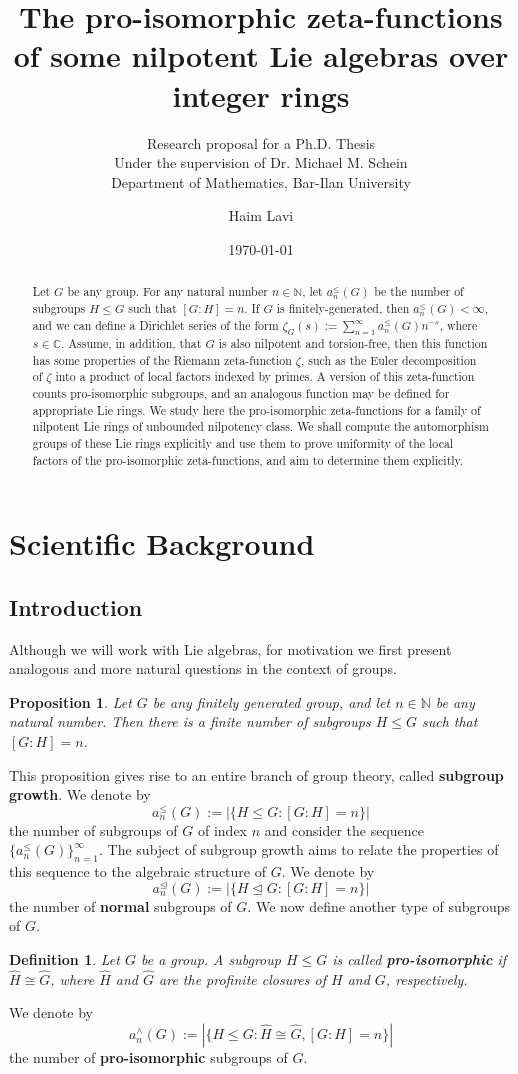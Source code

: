 \documentclass[12pt]{article}
\title{The pro-isomorphic zeta-functions of some nilpotent Lie algebras over integer rings}
\subtitle{Research proposal for a Ph.D. Thesis\\
Under the supervision of Dr. Michael M. Schein\\
Department of Mathematics, Bar-Ilan University}
\author{Haim Lavi}
\date{\today}
\newtheorem{proposition}[theorem]{Proposition}
\newtheorem{definition}[theorem]{Definition}
\begin{document}
\maketitle
\newpage
\tableofcontents
\newpage
\begin{abstract}
Let $G$ be any group. For any natural number $n\in\mathbb{N}$, let $a_{n}^{\leq}(G)$ be the number of subgroups $H\leq G$ such that $[G:H]=n$. If $G$ is finitely-generated, then $a_{n}^{\leq}(G)<\infty$, and we can define a Dirichlet series of the form $\zeta_G(s):=\sum_{n=1}^\infty a_{n}^{\leq}(G){n}^{-s}$, where $s\in\mathbb{C}$. Assume, in addition, that $G$ is also nilpotent and torsion-free, then this function has some properties of the Riemann zeta-function $\zeta$, such as the Euler decomposition of $\zeta$ into a product of local factors indexed by primes. A version of this zeta-function counts pro-isomorphic subgroups, and an analogous function may be defined for appropriate Lie rings. We study here the pro-isomorphic zeta-functions for a family of nilpotent Lie rings of unbounded nilpotency class. We shall compute the automorphism groups of these Lie rings explicitly and use them to prove uniformity of the local factors of the pro-isomorphic zeta-functions, and aim to determine them explicitly.
\end{abstract}
\section{Scientific Background}
\subsection{Introduction}
Although we will work with Lie algebras, for motivation we first present analogous and more natural questions in the context of groups.
\begin{proposition} \label{prop:finite.number.subgroups}
Let $G$ be any finitely generated group, and let $n\in\mathbb{N}$ be any natural number. Then there is a finite number of subgroups $H\leq G$ such that $[G:H]=n$.
\end{proposition}
This proposition gives rise to an entire branch of group theory, called \textbf{subgroup growth}. We denote by \[a_{n}^{\leq}(G):=|\{H\leq{G} : [G:H]=n\}|\]
the number of subgroups of $G$ of index $n$ and consider the sequence $\{a_{n}^{\leq}(G)\}_{n=1}^{\infty}$. The subject of subgroup growth aims to relate the properties of this sequence to the algebraic structure of $G$. We denote by \[a_{n}^{\trianglelefteq}(G):=|\{H\trianglelefteq{G} : [G:H]=n\}|\]
the number of \textbf{normal} subgroups of $G$. We now define another type of subgroups of $G$.
\begin{definition}
\label{def:pro.isomorphic}
Let $G$ be a group. A subgroup $H\leq G$ is called \textbf{pro-isomorphic} if $\widehat{H}\cong\widehat{G}$, where $\widehat{H}$ and $\widehat{G}$ are the profinite closures of $H$ and $G$, respectively.
\end{definition}
We denote by \[a_{n}^{\wedge}(G):=|\{H\leq G : \widehat{H}\cong\widehat{G}, [G:H]=n\}|\]
the number of \textbf{pro-isomorphic} subgroups of $G$.
\end{document}
